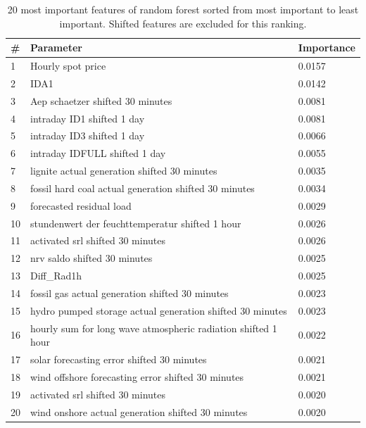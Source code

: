 \documentclass[class=scrbook, crop=false]{standalone}
\begin{document}
\begin{table}[]
\centering
\begin{tabular}{l|l|l}
 \# & Parameter & Importance \\\hline
 1 & Hourly spot price& 0.0157\\
 2 & IDA1&0.0142 \\
 3 &Aep schaetzer shifted 30 minutes&0.0081 \\
 4 & intraday ID1 shifted 1 day &0.0081\\
 5 &intraday ID3 shifted 1 day &0.0066\\
 6 &intraday IDFULL shifted 1 day &0.0055\\
 7 &lignite actual generation shifted 30 minutes&0.0035 \\
 8&fossil hard coal actual generation shifted 30 minutes &0.0034\\
 9&forecasted residual load &0.0029\\
 10&stundenwert der feuchttemperatur shifted 1 hour &0.0026\\
 11&activated srl shifted 30 minutes&0.0026 \\
 12&nrv saldo shifted 30 minutes &  0.0025\\
 13&Diff\_Rad1h&0.0025 \\
14& fossil gas actual generation shifted 30 minutes&0.0023 \\
15&hydro pumped storage actual generation shifted 30 minutes&0.0023\\
16&hourly sum for long wave atmospheric radiation shifted 1 hour&0.0022 \\
17&solar forecasting error shifted 30 minutes &0.0021\\
18&wind offshore forecasting error shifted 30 minutes&0.0021 \\
19&activated srl shifted 30 minutes&0.0020 \\
20&wind onshore actual generation shifted 30 minutes &0.0020\\
\end{tabular}
\caption{20 most important features of random forest sorted from most important to least important. Shifted features are excluded for this ranking.}
\label{Table::Feature_importance}
\end{table}
\end{document}
